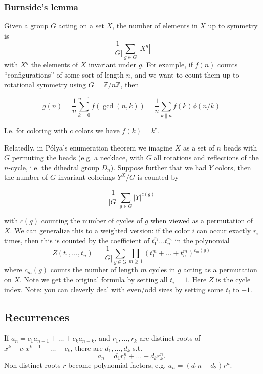 \documentclass[
	a4paper,
	landscape,
	10pt,
]{article}
\begin{document}
\begin{multicols}{3}
		\subsubsection*{Burnside's lemma}
			Given a group $G$ acting on a set $X$, the number of elements in $X$ up to
			symmetry is $$\frac{1}{|G|}\sum_{g\in G} |X^g|$$ with $X^g$ the elements of
			$X$ invariant under $g$. For example, if $f(n)$ counts ``configurations''
			of some sort of length $n$, and we want to count them up to rotational symmetry
			using $G = \mathbb{Z}/n\mathbb{Z}$, then

			$$g(n) = \frac{1}{n} \sum_{k=0}^{n-1} f(\gcd(n, k))
				= \frac{1}{n}\sum_{k \| n} f(k) \phi(n / k)$$

			I.e. for coloring with $c$ colors we have $f(k) = k^c$.

			Relatedly, in P\'olya's enumeration theorem we imagine $X$ as a set of $n$
			beads with $G$ permuting the beads (e.g. a necklace, with $G$ all rotations and
			reflections of the $n$-cycle, i.e. the dihedral group $D_n$).
			Suppose further that we had $Y$ colors, then
			the number of $G$-invariant colorings $Y^X / G$ is counted by

			$$\frac{1}{|G|}\sum_{g\in G} |Y|^{c(g)}$$

			with $c(g)$ counting the number of cycles of $g$ when viewed as a permutation
			of $X$. We can generalize this to a weighted version: if the color $i$ can
			occur exactly $r_i$ times, then this is counted by the coefficient of
			$t_1^{r_1}\dots t_n^{r_n}$ in the polynomial
			$$Z(t_1,\dots,t_n) = \frac{1}{|G|}\sum_{g\in G} \prod_{m\geq 1}
				(t_1^m+\dots+t_n^m)^{c_m(g)}$$
			where $c_m(g)$ counts the number of length $m$ cycles in $g$ acting as a
			permutation on $X$. Note we get the original formula by setting all $t_i=1$.
			Here $Z$ is the cycle index. Note: you can cleverly deal with even/odd sizes
			by setting some $t_i$ to $-1$.
		

    \subsection{Recurrences}
        If $a_n = c_1 a_{n-1} + \dots + c_k a_{n-k}$, and $r_1, \dots, r_k$ are distinct roots of $x^k - c_1 x^{k-1} - \dots - c_k$, there are $d_1, \dots, d_k$ s.t.
        \[a_n = d_1r_1^n + \dots + d_kr_k^n. \]
        Non-distinct roots $r$ become polynomial factors, e.g. $a_n = (d_1n + d_2)r^n$.


\end{multicols}
\end{document}
